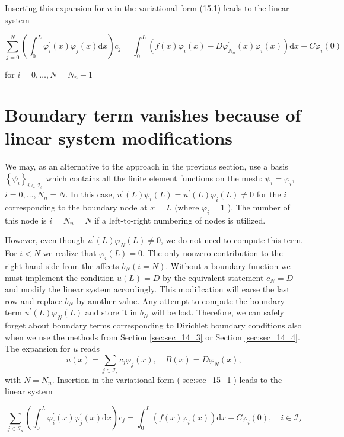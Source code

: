 \documentclass[../main.tex]{subfiles}
\begin{document}
		Inserting this expansion for $u$ in the variational form (15.1) leads to the linear system
	
		\begin{equation}
			\label{eqa189}
			\sum_{j=0}^{N}\left(\int_{0}^{L} \varphi_{i}^{\prime}(x) \varphi_{j}^{\prime}(x) \mathrm{d} 	x\right) c_{j}=\int_{0}^{L}\left(f(x) \varphi_{i}(x)-D \varphi_{N_{n}}^{\prime}(x) \varphi_{i}(x)\right) \mathrm{d} x-C \varphi_{i}(0)
		\end{equation}
	
		for $i=0, \ldots, N=N_{n}-1$ \bigbreak 
		
	\section[Boundary conditions: specified derivative]{Boundary term vanishes because of linear system modifications}	
		\label{sec:sec_15_3}
		\noindent We may, as an alternative to the approach in the previous section, use a basis $\left\{\psi_{i}\right\}_{i \in \mathcal{I}_{s}}$ which contains all the finite element functions on the mesh: $\psi_{i}=\varphi_{i}$, $i=0, \ldots, N_{n}=N$. In this case, $u^{\prime}(L) \psi_{i}(L)=u^{\prime}(L) \varphi_{i}(L) \neq 0$ for the $i$ corresponding to the boundary node at $x=L$ (where $\varphi_{i}=1$ ). The number of this node is $i=N_{n}=N$ if a left-to-right numbering of nodes is utilized.
		
		However, even though $u^{\prime}(L) \varphi_{N}(L) \neq 0$, we do not need to compute this term. For $i<N$ we realize that $\varphi_{i}(L)=0$. The only nonzero contribution to the right-hand side from the affects $b_{N}(i=N)$. Without a boundary function we must implement the condition $u(L)=D$ by the equivalent statement $c_{N}=D$ and modify the linear system accordingly. This modification will earse the last row and replace $b_{N}$ by another value. Any attempt to compute the boundary term $u^{\prime}(L) \varphi_{N}(L)$ and store it in $b_{N}$ will be lost. Therefore, we can safely forget about boundary terms corresponding to Dirichlet boundary conditions also when we use the methods from Section \ref{sec:sec_14_3} or Section \ref{sec:sec_14_4}.\smallbreak
		The expansion for $u$ reads
		$$
		u(x)=\sum_{j \in \mathcal{I}_{s}} c_{j} \varphi_{j}(x), \quad B(x)=D \varphi_{N}(x),
		$$
		with $N=N_{n}$. Insertion in the variational form (\ref{sec:sec_15_1}) leads to the linear system
	
		\begin{equation}
			\label{eqa190}
			\sum_{j \in \mathcal{I}_{s}}\left(\int_{0}^{L} \varphi_{i}^{\prime}(x) \varphi_{j}^{\prime}(x) \mathrm{d} x\right) c_{j}=\int_{0}^{L}\left(f(x) \varphi_{i}(x)\right) \mathrm{d} x-C \varphi_{i}(0), \quad i \in 	\mathcal{I}_{s}
		\end{equation}
	
\end{document}
